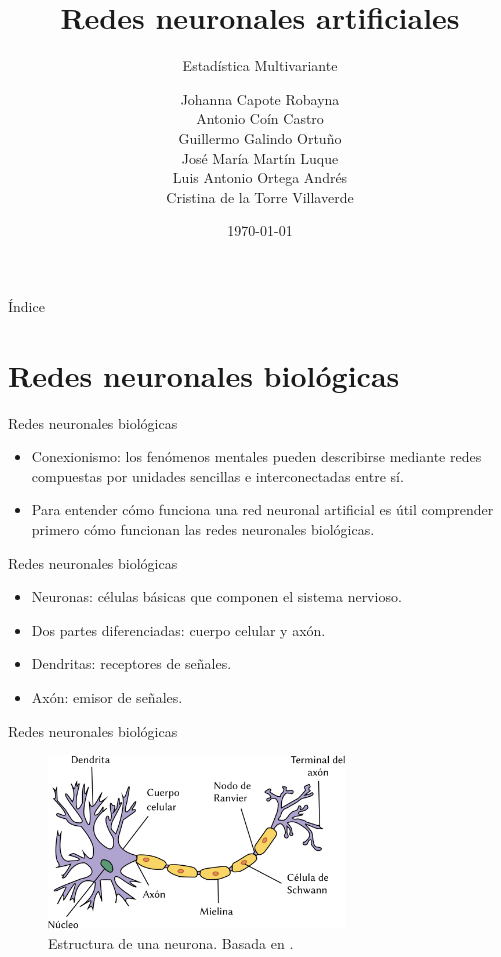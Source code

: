 \documentclass[spanish]{beamer}
\title{Redes neuronales artificiales}
\subtitle{Estadística Multivariante}
\author{
  Johanna Capote Robayna\texorpdfstring{\\}{}
  Antonio Coín Castro\texorpdfstring{\\}{}
  Guillermo Galindo Ortuño\texorpdfstring{\\}{}
  José María Martín Luque\texorpdfstring{\\}{}
  Luis Antonio Ortega Andrés\texorpdfstring{\\}{}
  Cristina de la Torre Villaverde
}
\institute{\normalsize Universidad de Granada}
\date{\today}
\begin{document}
\maketitle

\begin{frame}{Índice}
  \tableofcontents
\end{frame}

\section{Redes neuronales biológicas}

\begin{frame}{Redes neuronales biológicas}
  \begin{itemize}
    \item Conexionismo: los fenómenos mentales pueden describirse mediante redes compuestas por unidades sencillas e interconectadas entre sí.
    \item Para entender cómo funciona una red neuronal artificial es útil comprender primero cómo funcionan las redes neuronales biológicas.
  \end{itemize}
\end{frame}

\begin{frame}{Redes neuronales biológicas}
  \begin{itemize}
    \item Neuronas: células básicas que componen el sistema nervioso.
    \item Dos partes diferenciadas: cuerpo celular y axón.
    \item Dendritas: receptores de señales.
    \item Axón: emisor de señales.
  \end{itemize}
\end{frame}

\begin{frame}{Redes neuronales biológicas}
  \begin{figure}[b]
    \centering
    \includegraphics[width=0.7\textwidth]{img/neurona}
    \caption{Estructura de una neurona. Basada en \parencite{dhp1080_neurona_2007}.}
    \label{fig:neurona}
  \end{figure}
\end{frame}
\end{document}
